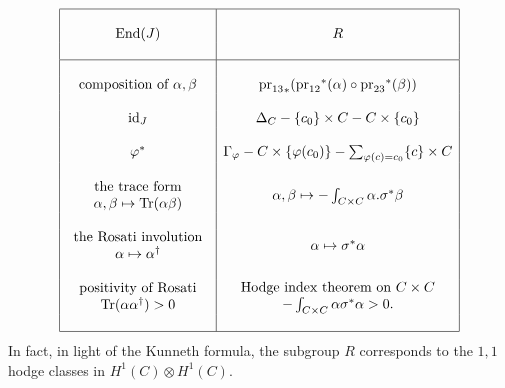 $$
\begin{array}{|c|c|}
\hline 
& \\
\text{End}(J)  & R 
\\ & \\
\hline
& \\
\text{composition of $\alpha, \beta$} 
& 
{\text{pr}_{13}}_* ({\text{pr}_{12}}^*(\alpha) \circ {\text{pr}_{23}}^*(\beta)) 
\\ & \\
\text{id}_J 
& 
\Delta_C - \{c_0\} \times C - C \times \{c_0\}
\\ & \\
\varphi^* 
& 
\Gamma_\varphi - C \times \{\varphi(c_0)\} - \sum_{\varphi(c) = c_0} \{c\} 
\times C 
\\ & \\
{\begin{array}{c}
\text{the trace form} \\
\alpha, \beta \mapsto \text{Tr}(\alpha \beta)
\end{array}}
& 
\alpha, \beta \mapsto - \int_{C\times C} \alpha . \sigma^*\beta
\\ & \\
{\begin{array}{c}
\text{the Rosati involution} \\
\alpha \mapsto \alpha^\dagger
\end{array}}
&  
\alpha \mapsto \sigma^*\alpha
\\ & \\
{\begin{array}{c}
\text{positivity of Rosati} \\
\text{Tr}(\alpha\alpha^\dagger) > 0
\end{array}}
&  
{\begin{array}{c}
\text{Hodge index theorem on $C\times C$} \\
- \int_{C\times C} \alpha \sigma^*\alpha > 0.
\end{array}}
\\ & \\
\hline
\end{array}
$$
In fact, in light of the Kunneth formula, the subgroup $R$ corresponds to the 
$1,1$ hodge classes in $H^1(C)\otimes H^1(C)$.

